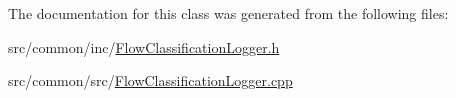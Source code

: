 The documentation for this class was generated from the following files\-:\begin{DoxyCompactItemize}
\item 
src/common/inc/\hyperlink{_flow_classification_logger_8h}{Flow\-Classification\-Logger.\-h}\item 
src/common/src/\hyperlink{_flow_classification_logger_8cpp}{Flow\-Classification\-Logger.\-cpp}\end{DoxyCompactItemize}
